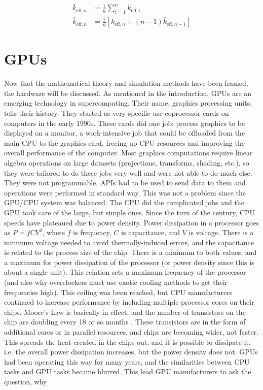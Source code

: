 \begin{equation}
\label{k_eff_final}
\begin{split}
\bar{k}_{\mathrm{eff},n} &= \frac{1}{n} \sum_{i=1}^{n} k_{\mathrm{eff},i} \\
\bar{k}_{\mathrm{eff},n} &= \frac{1}{n} \left[ k_{\mathrm{eff},n} + (n-1) \bar{k}_{\mathrm{eff},n-1}  \right]
\end{split}
\end{equation}



\section{GPUs}

Now that the mathematical theory and simulation methods have been framed, the hardware will be discussed.  As mentioned in the introduction, GPUs are an emerging technology in supercomputing.  Their name, graphics processing units, tells their history.  They started as very specific use coprocessor cards on computers in the early 1990s.  These cards did one job:  process graphics to be displayed on a monitor, a work-intensive job that could be offloaded from the main CPU to the graphics card, freeing up CPU resources and improving the overall performance of the computer.  Most graphics computations require linear algebra operations on large datasets (projections, transforms, shading, etc.), so they were tailored to do these jobs very well and were not able to do much else.  They were not programmable, APIs had to be used to send data to them and operations were performed in standard way.  This was not a problem since the GPU/CPU system was balanced.  The CPU did the complicated jobs and the GPU took care of the large, but simple ones.  Since the turn of the century, CPU speeds have plateaued due to power density.  Power dissipation in a processor goes as $P=fCV^2$, where $f$ is frequency, $C$ is capacitance, and $V$ is voltage.  There is a minimum voltage needed to avoid thermally-induced errors, and the capacitance is related to the process size of the chip.  There is a minimum to both values, and a maximum for power dissipation of the processor (or power density since this is about a single unit).  This relation sets a maximum frequency of the processor (and also why overclockers must use exotic cooling methods to get their frequencies high).  This ceiling was been reached, but CPU manufacturers continued to increase performance by including multiple processor cores on their chips.  Moore's Law is basically in effect, and the number of transistors on the chip are doubling every 18 or so months \cite{moore}.  These transistors are in the form of additional cores or in parallel resources, and chips are becoming wider, not faster.  This spreads the heat created in the chips out, and it is possible to dissipate it, i.e. the overall power dissipation increases, but the power density does not.  GPUs had been operating this way for many years, and the similarities between CPU tasks and GPU tasks became blurred.  This lead GPU manufacturers to ask the question, why 